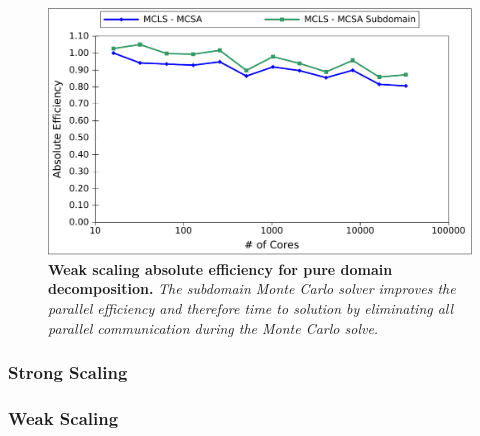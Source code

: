 \begin{figure}[t!]
  \begin{center}
    \includegraphics[width=6in]{chapters/parallel_mc/titan_weak_subdomain.pdf}
  \end{center}
  \caption{\textbf{Weak scaling absolute efficiency for pure domain
      decomposition.} \textit{The subdomain Monte Carlo solver
      improves the parallel efficiency and therefore time to solution
      by eliminating all parallel communication during the Monte Carlo
      solve.}}
  \label{fig:titan_weak_subdomain}
\end{figure}

\subsubsection{Strong Scaling}
\label{subsubsec:full_clip_strong}

\clearpage

\subsubsection{Weak Scaling}
\label{subsubsec:full_clip_weak}





